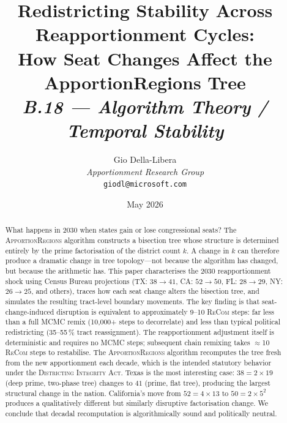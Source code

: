 \documentclass[12pt]{article}
\title{%
  \textbf{Redistricting Stability Across Reapportionment Cycles:}\\
  \textbf{How Seat Changes Affect the ApportionRegions Tree}\\[0.8em]
  \normalsize\textit{B.18 --- Algorithm Theory / Temporal Stability}%
}
\author{%
  Gio Della-Libera\\
  \textit{Apportionment Research Group}\\
  \small\texttt{giodl@microsoft.com}
}
\date{May 2026}
\newcommand{\ar}{\textsc{ApportionRegions}}
\newcommand{\dia}{\textsc{Districting Integrity Act}}
\newcommand{\recom}{\textsc{ReCom}}
\begin{document}
\maketitle

\begin{abstract}
\noindent
What happens in 2030 when states gain or lose congressional seats?
The \ar{} algorithm constructs a bisection tree whose structure is
determined entirely by the prime factorisation of the district count $k$.
A change in $k$ can therefore produce a dramatic change in tree
topology---not because the algorithm has changed, but because the
arithmetic has.
This paper characterises the 2030 reapportionment shock using
Census Bureau projections (TX: $38 \to 41$, CA: $52 \to 50$,
FL: $28 \to 29$, NY: $26 \to 25$, and others), traces how
each seat change alters the bisection tree, and simulates
the resulting tract-level boundary movements.
The key finding is that seat-change-induced disruption is
equivalent to approximately 9--10 \recom{} steps: far less than
a full MCMC remix (10{,}000+ steps to decorrelate) and less than
typical political redistricting (35--55\,\% tract reassignment).
The reapportionment adjustment itself is deterministic and requires
no MCMC steps; subsequent chain remixing takes $\approx$10 \recom{}
steps to restabilise.
The \ar{} algorithm recomputes the tree fresh from the new
apportionment each decade, which is the intended statutory
behavior under the \dia{}.
Texas is the most interesting case: $38 = 2 \times 19$ (deep prime,
two-phase tree) changes to $41$ (prime, flat tree), producing
the largest structural change in the nation.
California's move from $52 = 4 \times 13$ to $50 = 2 \times 5^2$
produces a qualitatively different but similarly disruptive
factorisation change.
We conclude that decadal recomputation is algorithmically sound
and politically neutral.
\end{abstract}

\tableofcontents
\newpage











\end{document}
